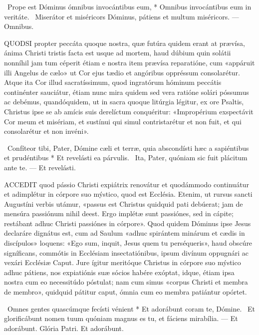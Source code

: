 \R\ Prope est Dóminus ómnibus invocántibus eum, * Omnibus invocántibus eum in veritáte. \V\ Miserátor et miséricors Dóminus, pátiens et multum miséricors. --- Omnibus.


\lettrine[lines=2]{Q}{UODSI} propter peccáta quoque nostra, quæ futúra quidem erant at prævísa, ánima Christi tristis facta est usque ad mortem, haud dúbium quin solátii nonníhil jam tum céperit étiam e nostra item prævísa reparatióne, cum «appáruit illi Angelus de cælo» ut Cor ejus tædio et angóribus oppréssum consolarétur. Atque ita Cor illud sacratíssimum, quod ingratórum hóminum peccátis continénter sauciátur, étiam nunc mira quidem sed vera ratióne solári póssumus ac debémus, quandóquidem, ut in sacra quoque litúrgia légitur, ex ore Psaltis, Christus ipse se ab amícis suis derelíctum conquéritur: «Impropérium exspectávit Cor meum et misériam, et sustínui qui simul contristarétur et non fuit, et qui consolarétur et non invéni».

\R\ Confíteor tibi, Pater, Dómine cæli et terræ, quia abscondísti hæc a sapiéntibus et prudéntibus * Et revelásti ea párvulis. \V\ Ita, Pater, quóniam sic fuit plácitum ante te. --- Et revelásti.


\lettrine[lines=2]{A}{CCEDIT} quod pássio Christi expiátrix renovátur et quodámmodo continuátur et adimplétur in córpore suo mýstico, quod est Ecclésia. Etenim, ut rursus sancti Augustíni verbis utámur, «passus est Christus quidquid pati debúerat; jam de mensúra passiónum nihil deest. Ergo implétæ sunt passiónes, sed in cápite; restábant adhuc Christi passiónes in córpore». Quod quidem Dóminus ipse Jesus declaráre dignátus est, cum ad Saulum «adhuc spirántem minárum et cædis in discípulos» loquens: «Ego sum, inquit, Jesus quem tu perséqueris», haud obscúre signíficans, commótis in Ecclésiam insectatiónibus, ipsum divínum oppugnári ac vexári Ecclésiæ Caput. Jure ígitur meritóque Christus in córpore suo mýstico adhuc pátiens, nos expiatiónis suæ sócios habére exóptat, idque, étiam ipsa nostra cum eo necessitúdo póstulat; nam cum simus «corpus Christi et membra de membro», quidquid pátitur caput, ómnia cum eo membra patiántur opórtet.

\R\ Omnes gentes quascúmque fecísti vénient * Et adorábunt coram te, Dómine. \V\ Et glorificábunt nomen tuum quóniam magnus es tu, et fáciens mirabília. --- Et adorábunt. Glória Patri. Et adorábunt.


